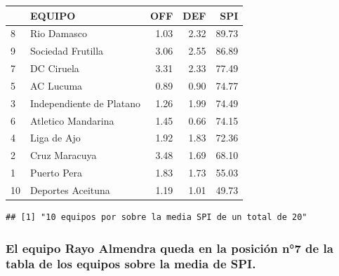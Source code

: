 \documentclass[]{article}
\newenvironment{Shaded}{\begin{snugshade}}{\end{snugshade}}
\newcommand{\KeywordTok}[1]{\textcolor[rgb]{0.13,0.29,0.53}{\textbf{#1}}}
\newcommand{\NormalTok}[1]{#1}
\newcommand{\OperatorTok}[1]{\textcolor[rgb]{0.81,0.36,0.00}{\textbf{#1}}}
\newcommand{\StringTok}[1]{\textcolor[rgb]{0.31,0.60,0.02}{#1}}
\begin{document}
\begin{table}[H]
\centering
\begin{tabular}{l|l|r|r|r}
\hline
  & EQUIPO & OFF & DEF & SPI\\
\hline
\rowcolor{gray!6}  8 & Rio Damasco & 1.03 & 2.32 & 89.73\\
\hline
9 & Sociedad Frutilla & 3.06 & 2.55 & 86.89\\
\hline
\rowcolor{gray!6}  7 & DC Ciruela & 3.31 & 2.33 & 77.49\\
\hline
5 & AC Lucuma & 0.89 & 0.90 & 74.77\\
\hline
\rowcolor{gray!6}  3 & Independiente de  Platano & 1.26 & 1.99 & 74.49\\
\hline
6 & Atletico Mandarina & 1.45 & 0.66 & 74.15\\
\hline
\rowcolor{gray!6}  4 & Liga de Ajo & 1.92 & 1.83 & 72.36\\
\hline
2 & Cruz Maracuya & 3.48 & 1.69 & 68.10\\
\hline
\rowcolor{gray!6}  1 & Puerto Pera & 1.83 & 1.73 & 55.03\\
\hline
10 & Deportes Aceituna & 1.19 & 1.01 & 49.73\\
\hline
\end{tabular}
\end{table}

\begin{Shaded}
\end{Shaded}

\begin{verbatim}
## [1] "10 equipos por sobre la media SPI de un total de 20"
\end{verbatim}

\hypertarget{el-equipo-rayo-almendra-queda-en-la-posicion-n7-de-la-tabla-de-los-equipos-sobre-la-media-de-spi.}{%
\subsubsection{El equipo Rayo Almendra queda en la posición n°7 de la
tabla de los equipos sobre la media de
SPI.}\label{el-equipo-rayo-almendra-queda-en-la-posicion-n7-de-la-tabla-de-los-equipos-sobre-la-media-de-spi.}}
\end{document}
